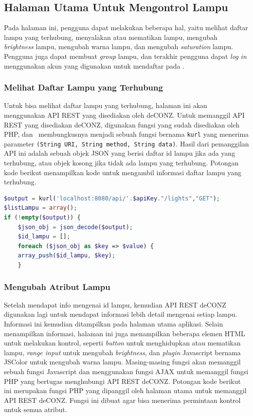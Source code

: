 \subsection{Halaman Utama Untuk Mengontrol Lampu}
Pada halaman ini, pengguna dapat melakukan beberapa hal, yaitu  melihat daftar lampu yang terhubung, menyalakan atau mematikan lampu, mengubah \textit{brightness} lampu, mengubah warna lampu, dan mengubah \textit{saturation} lampu. Pengguna juga dapat membuat \textit{group} lampu, dan terakhir pengguna dapat \textit{log in} menggunakan akun yang digunakan untuk mendaftar pada \plat.

\subsubsection{Melihat Daftar Lampu yang Terhubung}
Untuk bisa melihat daftar lampu yang terhubung, halaman ini akan menggunakan API REST yang disediakan oleh deCONZ. Untuk memanggil API REST yang disediakan deCONZ, digunakan fungsi  yang sudah disediakan oleh PHP, dan \saya~membungkusnya menjadi sebuah fungsi bernama \texttt{kurl} yang menerima parameter \texttt{(String URI, String method, String data)}. Hasil dari pemanggilan API ini adalah sebuah objek JSON yang berisi daftar id lampu jika ada yang terhubung, atau objek kosong jika tidak ada lampu yang terhubung. Potongan kode berikut menampilkan kode untuk mengambil informasi daftar lampu yang terhubung.

\begin{lstlisting}[language=PHP,label=code:timer,caption=Mengambil informasi daftar lampu]
$output = kurl('localhost:8080/api/'.$apiKey."/lights","GET");
$listLampu = array();
if (!empty($output)) {
	$json_obj = json_decode($output);
	$id_lampu = [];
	foreach ($json_obj as $key => $value) {
	array_push($id_lampu, $key);
	}
\end{lstlisting}

\subsubsection{Mengubah Atribut Lampu}

Setelah mendapat info mengenai id lampu, kemudian API REST deCONZ digunakan lagi untuk mendapat informasi lebih detail mengenai setiap lampu. Informasi ini kemudian ditampilkan pada halaman utama aplikasi. Selain menampilkan informasi, halaman ini juga menampilkan beberapa elemen HTML untuk melakukan kontrol, seperti \textit{button} untuk menghidupkan atau mematikan lampu, \textit{range input} untuk mengubah \textit{brightness}, dan \textit{plugin} Javascript bernama JSColor untuk mengubah warna lampu. Masing-masing fungsi akan memanggil sebuah fungsi Javascript dan menggunakan fungsi AJAX untuk memanggil fungsi PHP yang bertugas menghubungi API REST deCONZ. Potongan kode berikut ini merupakan fungsi PHP yang dipanggil oleh halaman utama untuk memanggil API REST deCONZ. Fungsi ini dibuat agar bisa menerima permintaan kontrol untuk semua atribut.

